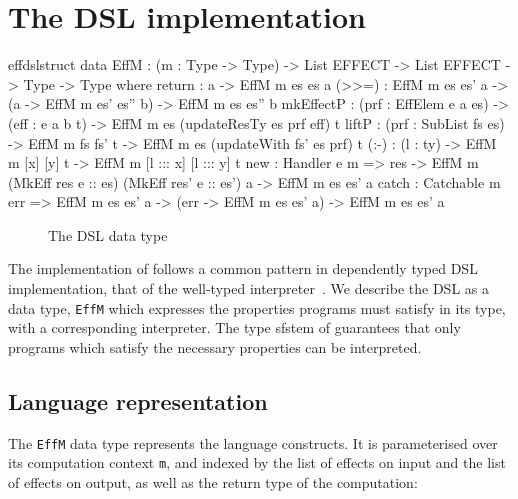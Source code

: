 \section{The \Eff{} DSL implementation}

\label{sect:effimpl}

\begin{SaveVerbatim}{effdslstruct}
data EffM : (m : Type -> Type) -> List EFFECT -> List EFFECT -> Type -> Type where
     return    : a -> EffM m es es a
     (>>=)     : EffM m es es' a -> (a -> EffM m es' es'' b) -> EffM m es es'' b
     mkEffectP : (prf : EffElem e a es) -> (eff : e a b t) -> EffM m es (updateResTy es prf eff) t
     liftP     : (prf : SubList fs es) -> EffM m fs fs' t -> EffM m es (updateWith fs' es prf) t
     (:-)      : (l : ty) -> EffM m [x] [y] t -> EffM m [l ::: x] [l ::: y] t
     new       : Handler e m => 
                 res -> EffM m (MkEff res e :: es) (MkEff res' e :: es') a -> EffM m es es' a
     catch     : Catchable m err => 
                 EffM m es es' a -> (err -> EffM m es es' a) -> EffM m es es' a
\end{SaveVerbatim}

\begin{figure*}[t]
\begin{center}
\end{center}
\caption{The \Eff{} DSL data type}
\label{effdsltype}
\end{figure*}

The implementation of \Eff{} follows a common pattern in dependently typed DSL
implementation, that of the well-typed
interpreter~\cite{augustsson1999exercise,Brady2006a,Pasalic2002}. We describe
the DSL as a data type, \texttt{EffM} which expresses the properties programs
must satisfy in its type, with a corresponding interpreter. The type sfstem of
\Idris{} guarantees that only programs which satisfy the necessary properties 
can be interpreted.

\subsection{Language representation}


The \texttt{EffM} data type represents the \Eff{} language constructs.
It is parameterised over its computation context \texttt{m},
and indexed by the list of effects on input and the list of effects on output,
as well as the return type of the computation:

